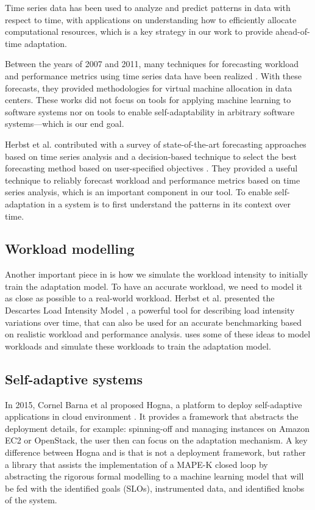 Time series data has been used to analyze and predict patterns in data with respect to time, with applications on understanding how to efficiently allocate computational resources, which is a key strategy in our work to provide ahead-of-time adaptation.

Between the years of 2007 and 2011, many techniques for forecasting workload and performance metrics using time series data have been realized \cite{gmach2007workload, towards_autonomic_allocation, bobroff2007dynamic, meng2010efficient, caron2011pattern}. With these forecasts, they provided methodologies for virtual machine allocation in data centers. These works did not focus on tools for applying machine learning to software systems nor on tools to enable self-adaptability in arbitrary software systems---which is our end goal.

Herbst et al. contributed with a survey of state-of-the-art forecasting approaches based on time series analysis and a decision-based technique to select the best forecasting method based on user-specified objectives \cite{herbst_self-adaptive_2014}. They provided a useful technique to reliably forecast workload and performance metrics based on time series analysis, which is an important component in our tool. To enable self-adaptation in a system is to first understand the patterns in its context over time.

\subsection{Workload modelling}

Another important piece in \projectname{} is how we simulate the workload intensity to initially train the adaptation model. To have an accurate workload, we need to model it as close as possible to a real-world workload. Herbst et al. presented the Descartes Load Intensity Model \cite{kistowski_modeling_2017}, a powerful tool for describing load intensity variations over time, that can also be used for an accurate benchmarking based on realistic workload and performance analysis. \projectname{} uses some of these ideas to model workloads and simulate these workloads to train the adaptation model.

\subsection{Self-adaptive systems}

In 2015, Cornel Barna et al proposed Hogna, a platform to deploy self-adaptive applications in cloud environment \cite{barna_hogna:_2015}. It provides a framework that abstracts the deployment details, for example: spinning-off and managing instances on Amazon EC2 or OpenStack, the user then can focus on the adaptation mechanism. A key difference between Hogna and \projectname{} is that \projectname{} is not a deployment framework, but rather a library that assists the implementation of a MAPE-K closed loop by abstracting the rigorous formal modelling to a machine learning model that will be fed with the identified goals (SLOs), instrumented data, and identified knobs of the system.

